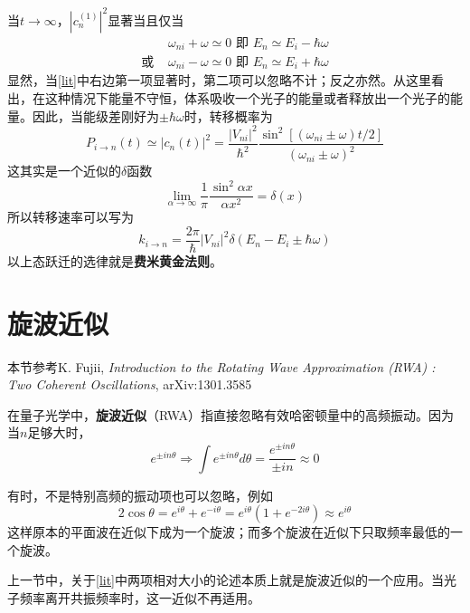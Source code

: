 当$ t\to\infty $，$ |c_n^{(1)}|^2 $显著当且仅当
\begin{align}
&\omega_{ni}+\omega\simeq 0 \text{ 即 } E_n\simeq E_i-\hbar\omega\\
\text{或 }&\omega_{ni}-\omega\simeq 0 \text{ 即 } E_n\simeq E_i+\hbar\omega
\end{align}
显然，当\eqref{lit}中右边第一项显著时，第二项可以忽略不计；反之亦然。从这里看出，在这种情况下能量不守恒，体系吸收一个光子的能量或者释放出一个光子的能量。因此，当能级差刚好为$ \pm \hbar\omega $时，转移概率为
\begin{equation}\label{key}
P_{i\to n}(t)\simeq|c_n(t)|^2=\dfrac{|V_{ni}|^2}{\hbar^2}\dfrac{\sin^2[(\omega_{ni}\pm\omega)t/2]}{(\omega_{ni}\pm\omega)^2}
\end{equation}
这其实是一个近似的$ \delta $函数
\begin{equation}\label{key}
\lim_{\alpha\to\infty}\dfrac{1}{\pi}\dfrac{\sin^2\alpha x}{\alpha x^2}=\delta(x)
\end{equation}
所以转移速率可以写为
\begin{equation}\label{key}
k_{i\to n}=\dfrac{2\pi}{\hbar}|V_{ni}|^2\delta(E_n-E_i\pm\hbar\omega)
\end{equation}
以上态跃迁的选律就是\textbf{费米黄金法则}。

\section{旋波近似}
\begin{framed}
本节参考K. Fujii, \textit{Introduction to the Rotating Wave Approximation (RWA) : Two Coherent Oscillations},  	arXiv:1301.3585
\end{framed}
在量子光学中，\textbf{旋波近似}（RWA）指直接忽略有效哈密顿量中的高频振动。因为当$ n $足够大时，
\begin{equation}\label{key}
e^{\pm in\theta}\Rightarrow\int e^{\pm in\theta}d\theta=\dfrac{e^{\pm in\theta}}{\pm in}\approx 0
\end{equation}

有时，不是特别高频的振动项也可以忽略，例如
\begin{equation}\label{key}
2\cos\theta=e^{i\theta}+e^{-i\theta}=e^{i\theta}(1+e^{-2i\theta})\approx e^{i\theta}
\end{equation}
这样原本的平面波在近似下成为一个旋波；而多个旋波在近似下只取频率最低的一个旋波。

上一节中，关于\eqref{lit}中两项相对大小的论述本质上就是旋波近似的一个应用。当光子频率离开共振频率时，这一近似不再适用。